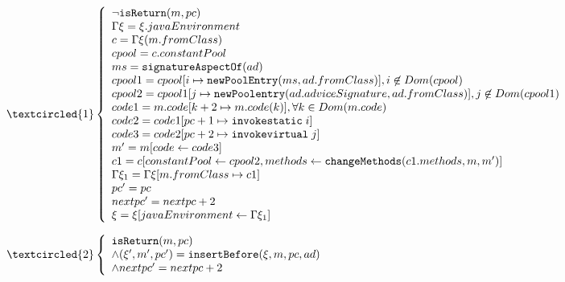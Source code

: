 \begin{itemize}
$\textcircled{1}\left\{
\begin{array}{l}
\neg \texttt{isReturn}(m,pc)\\
\Gamma\xi=\xi.javaEnvironment\\
c=\Gamma\xi(m.fromClass)\\
cpool=c.constantPool\\
ms=\texttt{signatureAspectOf}(ad)\\
cpool1=cpool[i\mapsto \texttt{newPoolEntry}(ms,ad.fromClass)],i\not\in Dom(cpool)\\
cpool2=cpool1[j\mapsto \texttt{newPoolentry}(ad.adviceSignature,ad.fromClass)],j\not\in Dom(cpool1)\\
code1 = m.code[k+2\mapsto m.code(k)],\forall k\in Dom(m.code)\\
code2=code1[pc+1\mapsto \texttt{invokestatic}\; i]\\
code3=code2[pc+2\mapsto \texttt{invokevirtual}\; j]\\
m^\prime=m[code\leftarrow code3]\\
c1= c[constantPool\leftarrow cpool2,methods\leftarrow \texttt{changeMethods}(c1.methods,m,m^\prime)]\\
\Gamma\xi_1=\Gamma\xi[m.fromClass\mapsto c1]\\
pc^\prime=pc\\
nextpc^\prime=nextpc+2\\
\xi=\xi[javaEnvironment\leftarrow\Gamma\xi_1]\\
\end{array}
\right.$

$\textcircled{2}\left\{
\begin{array}{l}
\texttt{isReturn}(m,pc)\\
\wedge (\xi^\prime,m^\prime,pc^\prime)=\texttt{insertBefore}(\xi,m,pc,ad)\\
\wedge nextpc^\prime=nextpc+2\\
\end{array}
\right.
$

\end{itemize}